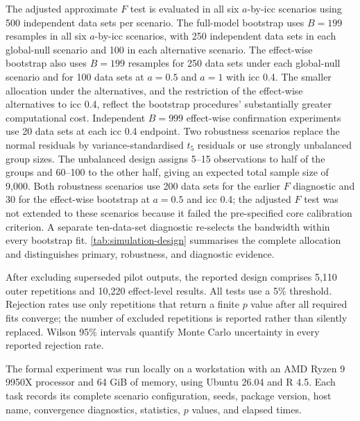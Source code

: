 \documentclass[times]{interact}
\theoremstyle{plain}%
\theoremstyle{definition}
\theoremstyle{remark}
\begin{document}
The adjusted approximate $F$ test is evaluated in all six $a$-by-\gls{icc} scenarios using 500 independent data sets per scenario.
The full-model bootstrap uses $B=199$ resamples in all six $a$-by-\gls{icc} scenarios, with 250 independent data sets in each global-null scenario and 100 in each alternative scenario.
The effect-wise bootstrap also uses $B=199$ resamples for 250 data sets under each global-null scenario and for 100 data sets at $a=0.5$ and $a=1$ with \gls{icc} 0.4.
The smaller allocation under the alternatives, and the restriction of the effect-wise alternatives to \gls{icc} 0.4, reflect the bootstrap procedures' substantially greater computational cost.
Independent $B=999$ effect-wise confirmation experiments use 20 data sets at each \gls{icc} 0.4 endpoint.
Two robustness scenarios replace the normal residuals by variance-standardised $t_5$ residuals or use strongly unbalanced group sizes.
The unbalanced design assigns 5--15 observations to half of the groups and 60--100 to the other half, giving an expected total sample size of 9,000.
Both robustness scenarios use 200 data sets for the earlier $F$ diagnostic and 30 for the effect-wise bootstrap at $a=0.5$ and \gls{icc} 0.4; the adjusted $F$ test was not extended to these scenarios because it failed the pre-specified core calibration criterion.
A separate ten-data-set diagnostic re-selects the bandwidth within every bootstrap fit.
\autoref{tab:simulation-design} summarises the complete allocation and distinguishes primary, robustness, and diagnostic evidence.



After excluding superseded pilot outputs, the reported design comprises 5,110 outer repetitions and 10,220 effect-level results.
All tests use a 5\% threshold.
Rejection rates use only repetitions that return a finite $p$ value after all required fits converge; the number of excluded repetitions is reported rather than silently replaced.
Wilson 95\% intervals quantify Monte Carlo uncertainty in every reported rejection rate.


The formal experiment was run locally on a workstation with an AMD Ryzen 9 9950X processor and 64 GiB of memory, using Ubuntu 26.04 and R 4.5.
Each task records its complete scenario configuration, seeds, package version, host name, convergence diagnostics, statistics, $p$ values, and elapsed times.
\end{document}

